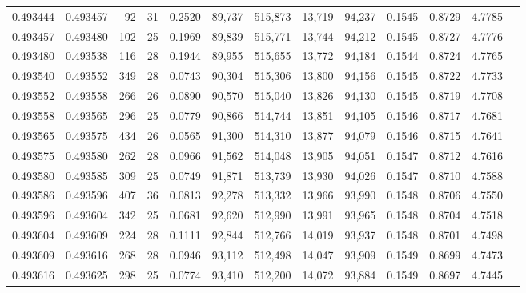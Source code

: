\begin{tabular}{rrrrrrrrrrrrr}
0.493444 & 0.493457 &  92 &  31 &                                     0.2520 &  89,737 & 515,873 &  13,719 &  94,237 & 0.1545 & 0.8729 & 4.7785 \\
0.493457 & 0.493480 & 102 &  25 &                                     0.1969 &  89,839 & 515,771 &  13,744 &  94,212 & 0.1545 & 0.8727 & 4.7776 \\
0.493480 & 0.493538 & 116 &  28 &                                     0.1944 &  89,955 & 515,655 &  13,772 &  94,184 & 0.1544 & 0.8724 & 4.7765 \\
0.493540 & 0.493552 & 349 &  28 &                                     0.0743 &  90,304 & 515,306 &  13,800 &  94,156 & 0.1545 & 0.8722 & 4.7733 \\
0.493552 & 0.493558 & 266 &  26 &                                     0.0890 &  90,570 & 515,040 &  13,826 &  94,130 & 0.1545 & 0.8719 & 4.7708 \\
0.493558 & 0.493565 & 296 &  25 &                                     0.0779 &  90,866 & 514,744 &  13,851 &  94,105 & 0.1546 & 0.8717 & 4.7681 \\
0.493565 & 0.493575 & 434 &  26 &                                     0.0565 &  91,300 & 514,310 &  13,877 &  94,079 & 0.1546 & 0.8715 & 4.7641 \\
0.493575 & 0.493580 & 262 &  28 &                                     0.0966 &  91,562 & 514,048 &  13,905 &  94,051 & 0.1547 & 0.8712 & 4.7616 \\
0.493580 & 0.493585 & 309 &  25 &                                     0.0749 &  91,871 & 513,739 &  13,930 &  94,026 & 0.1547 & 0.8710 & 4.7588 \\
0.493586 & 0.493596 & 407 &  36 &                                     0.0813 &  92,278 & 513,332 &  13,966 &  93,990 & 0.1548 & 0.8706 & 4.7550 \\
0.493596 & 0.493604 & 342 &  25 &                                     0.0681 &  92,620 & 512,990 &  13,991 &  93,965 & 0.1548 & 0.8704 & 4.7518 \\
0.493604 & 0.493609 & 224 &  28 &                                     0.1111 &  92,844 & 512,766 &  14,019 &  93,937 & 0.1548 & 0.8701 & 4.7498 \\
0.493609 & 0.493616 & 268 &  28 &                                     0.0946 &  93,112 & 512,498 &  14,047 &  93,909 & 0.1549 & 0.8699 & 4.7473 \\
0.493616 & 0.493625 & 298 &  25 &                                     0.0774 &  93,410 & 512,200 &  14,072 &  93,884 & 0.1549 & 0.8697 & 4.7445 \\

\end{tabular}
